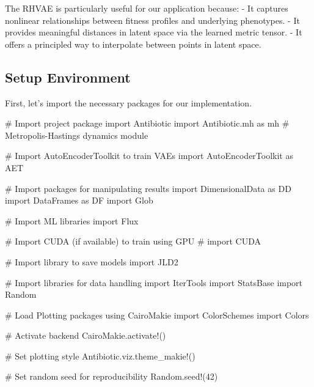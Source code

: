 \documentclass[
]{scrartcl}
\newenvironment{Shaded}{\begin{snugshade}}{\end{snugshade}}
\newcommand{\BuiltInTok}[1]{\textcolor[rgb]{0.00,0.23,0.31}{#1}}
\newcommand{\CommentTok}[1]{\textcolor[rgb]{0.37,0.37,0.37}{#1}}
\newcommand{\FloatTok}[1]{\textcolor[rgb]{0.68,0.00,0.00}{#1}}
\newcommand{\FunctionTok}[1]{\textcolor[rgb]{0.28,0.35,0.67}{#1}}
\newcommand{\ImportTok}[1]{\textcolor[rgb]{0.00,0.46,0.62}{#1}}
\newcommand{\NormalTok}[1]{\textcolor[rgb]{0.00,0.23,0.31}{#1}}
\begin{document}
The RHVAE is particularly useful for our application because: - It
captures nonlinear relationships between fitness profiles and underlying
phenotypes. - It provides meaningful distances in latent space via the
learned metric tensor. - It offers a principled way to interpolate
between points in latent space.

\subsection{Setup Environment}\label{setup-environment}

First, let's import the necessary packages for our implementation.

\begin{Shaded}
\begin{Highlighting}[]
\CommentTok{\# Import project package}
\ImportTok{import} \BuiltInTok{Antibiotic}
\ImportTok{import} \BuiltInTok{Antibiotic.mh}\NormalTok{ as mh }\CommentTok{\# Metropolis{-}Hastings dynamics module}

\CommentTok{\# Import AutoEncoderToolkit to train VAEs}
\ImportTok{import} \BuiltInTok{AutoEncoderToolkit}\NormalTok{ as AET}

\CommentTok{\# Import packages for manipulating results}
\ImportTok{import} \BuiltInTok{DimensionalData}\NormalTok{ as DD}
\ImportTok{import} \BuiltInTok{DataFrames}\NormalTok{ as DF}
\ImportTok{import} \BuiltInTok{Glob}

\CommentTok{\# Import ML libraries}
\ImportTok{import} \BuiltInTok{Flux}

\CommentTok{\# Import CUDA (if available) to train using GPU}
\CommentTok{\# import CUDA}

\CommentTok{\# Import library to save models}
\ImportTok{import} \BuiltInTok{JLD2}

\CommentTok{\# Import libraries for data handling}
\ImportTok{import} \BuiltInTok{IterTools}
\ImportTok{import} \BuiltInTok{StatsBase}
\ImportTok{import} \BuiltInTok{Random}

\CommentTok{\# Load Plotting packages}
\ImportTok{using} \BuiltInTok{CairoMakie}
\ImportTok{import} \BuiltInTok{ColorSchemes}
\ImportTok{import} \BuiltInTok{Colors}

\CommentTok{\# Activate backend}
\NormalTok{CairoMakie.}\FunctionTok{activate!}\NormalTok{()}

\CommentTok{\# Set plotting style}
\NormalTok{Antibiotic.viz.}\FunctionTok{theme\_makie!}\NormalTok{()}

\CommentTok{\# Set random seed for reproducibility}
\BuiltInTok{Random}\NormalTok{.}\FunctionTok{seed!}\NormalTok{(}\FloatTok{42}\NormalTok{)}
\end{Highlighting}
\end{Shaded}
\end{document}
